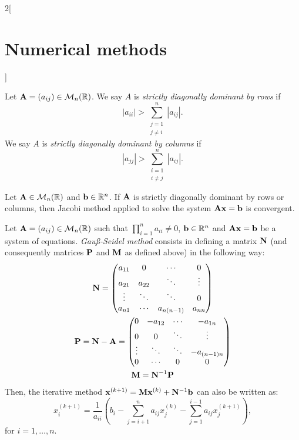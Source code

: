\documentclass[../../../main.tex]{subfiles}
\begin{document}
\begin{multicols}{2}[\section{Numerical methods}]
\begin{definition}
\end{definition}
\begin{definition}
    Let $\vb{A}=(a_{ij})\in\mathcal{M}_n(\mathbb{R})$. We say $A$ is \textit{strictly diagonally dominant by rows} if $$|a_{ii}|>\sum_{\substack{j=1\\j\ne i}}^n|a_{ij}|.$$
    We say $A$ is \textit{strictly diagonally dominant by columns} if $$|a_{jj}|>\sum_{\substack{i=1\\i\ne j}}^n|a_{ij}|.$$
\end{definition}
\begin{theorem}
    Let $\vb{A}\in\mathcal{M}_n(\mathbb{R})$ and $\vb{b}\in\mathbb{R}^n$. If $\vb{A}$ is strictly diagonally dominant by rows or columns, then Jacobi method applied to solve the system $\vb{A}\vb{x}=\vb{b}$ is convergent.
\end{theorem}
\begin{definition}
    Let $\vb{A}=(a_{ij})\in\mathcal{M}_n(\mathbb{R})$ such that $\prod_{i=1}^na_{ii}\ne 0$, $\vb{b}\in\mathbb{R}^n$ and $\vb{A}\vb{x}=\vb{b}$ be a system of equations. \textit{Gau\ss-Seidel method} consists in defining a matrix $\vb{N}$ (and consequently matrices $\vb{P}$ and $\vb{M}$ as defined above) in the following way:
    \begin{gather*}
        \vb{N}=
        \begin{pmatrix}
            a_{11} & 0 & \cdots & 0\\
            a_{21} & a_{22} & \ddots & \vdots\\
            \vdots & \ddots & \ddots & 0\\
            a_{n1} & \cdots & a_{n(n-1)} & a_{nn}
        \end{pmatrix}\\
        \vb{P}=\vb{N}-\vb{A}=
        \begin{pmatrix}
            0 & -a_{12} & \cdots & -a_{1n}\\
            0 & 0 & \ddots & \vdots\\
            \vdots & \ddots & \ddots & -a_{(n-1)n}\\
            0 & \cdots & 0 & 0
        \end{pmatrix}\\
        \vb{M}=\vb{N}^{-1}\vb{P}
    \end{gather*}
    Then, the iterative method $\vb{x}^{(k+1)}=\vb{M}\vb{x}^{(k)}+\vb{N}^{-1}\vb{b}$ can also be written as: $$x_i^{(k+1)}=\frac{1}{a_{ii}}\left(b_i-\sum_{j=i+1}^na_{ij}x_j^{(k)}-\sum_{j=1}^{i-1}a_{ij}x_j^{(k+1)}\right),$$ for $i=1,\ldots,n$.

\end{definition}
\end{multicols}
\end{document}
